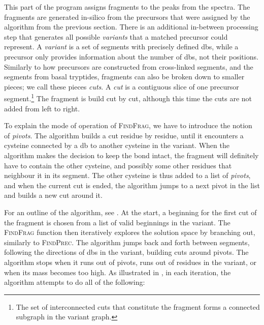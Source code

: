 This part of the program assigns fragments to the peaks from the spectra. The fragments are generated in-silico from the precursors that were assigned by the algorithm from the previous section. There is an additional in-between processing step that generates all possible \emph{variants} that a matched precursor could represent. A \emph{variant} is a set of segments with precisely defined \glspl*{db}, while a precursor only provides information about the number of \glspl*{db}, not their positions. Similarly to how precursors are constructed from cross-linked segments, and the segments from basal tryptides, fragments can also be broken down to smaller pieces; we call these pieces \emph{cuts}. A \emph{cut} is a contiguous slice of one precursor segment.\footnote{The set of interconnected cuts that constitute the fragment forms a connected subgraph in the variant graph.} The fragment is build cut by cut, although this time the cuts are not added from left to right.

To explain the mode of operation of \textsc{FindFrag}, we have to introduce the notion of \emph{pivots}. The algorithm builds a cut residue by residue, until it encounters a cysteine connected by a \gls*{db} to another cysteine in the variant. When the algorithm makes the decision to keep the bond intact, the fragment will definitely have to contain the other cysteine, and possibly some other residues that neighbour it in its segment. The other cysteine is thus added to a list of \emph{pivots}, and when the current cut is ended, the algorithm jumps to a next pivot in the list and builds a new cut around it.

For an outline of the algorithm, see . At the start, a beginning for the first cut of the fragment is chosen from a list of valid beginnings in the variant. The \textsc{FindFrag} function then iteratively explores the solution space by branching out, similarly to \textsc{FindPrec}. The algorithm jumps back and forth between segments, following the directions of \glspl*{db} in the variant, building cuts around pivots. The algorithm stops when it runs out of pivots, runs out of residues in the variant, or when its mass becomes too high. As illustrated in , in each iteration, the algorithm attempts to do all of the following:

